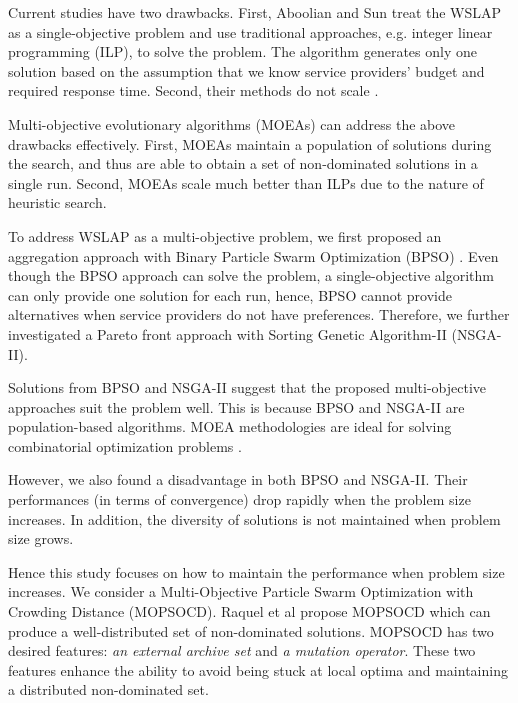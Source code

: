 \documentclass[10pt,journal,compsoc]{IEEEtran}
\begin{document}
Current studies have two drawbacks. First, Aboolian and Sun \cite{Aboolian, Sun} treat the WSLAP as a single-objective problem and use traditional approaches, e.g. integer linear programming (ILP), to solve the problem. The algorithm generates only one solution based on the assumption that we know service providers' budget and required response time. Second, their methods do not scale \cite{klotz2013practical}. 

Multi-objective evolutionary algorithms (MOEAs) can address the above drawbacks effectively. First, MOEAs maintain a population of solutions during the search, and thus are able to obtain a set of non-dominated solutions in a single run. Second, MOEAs scale much better than ILPs due to the nature of heuristic search.

To address WSLAP as a multi-objective problem, we first proposed an aggregation approach with Binary Particle Swarm Optimization (BPSO) \cite{Tan2016a}. Even though the BPSO approach can solve the problem, a single-objective algorithm can only provide one solution for each run, hence, BPSO cannot provide alternatives when service providers do not have preferences. Therefore, we further investigated a Pareto front approach \cite{Tan2016} with Sorting Genetic Algorithm-II (NSGA-II).

Solutions from BPSO and NSGA-II suggest that the proposed multi-objective approaches suit the problem well. This is because BPSO and NSGA-II are population-based algorithms. MOEA methodologies are ideal \cite{key:article} for solving combinatorial optimization problems \cite{tuladhar2016multi,senouci2016static}.

However, we also found a disadvantage in both BPSO and NSGA-II. Their performances (in terms of convergence) drop rapidly when the problem size increases. In addition, the diversity of solutions is not maintained when problem size grows. 

Hence this study focuses on how to maintain the performance when problem size increases. We consider a Multi-Objective Particle Swarm Optimization with Crowding Distance (MOPSOCD). Raquel et al \cite{Raquel} propose MOPSOCD which can produce a well-distributed set of non-dominated solutions. MOPSOCD has two desired features: \emph{an external archive set} and \emph{a mutation operator}. These two features enhance the ability to avoid being stuck at local optima and maintaining a distributed non-dominated set. 

\end{document}
